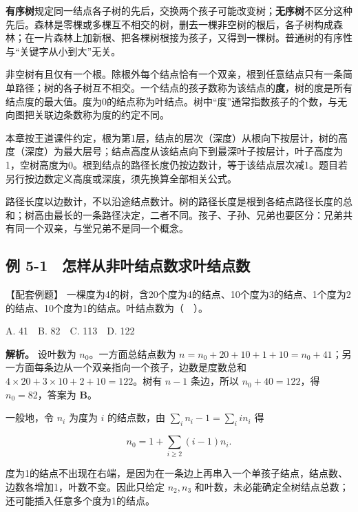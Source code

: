 \begin{definition}[树及结点的度]

\textbf{有序树}规定同一结点各子树的先后，交换两个孩子可能改变树；\textbf{无序树}不区分这种先后。森林是零棵或多棵互不相交的树，删去一棵非空树的根后，各子树构成森林；在一片森林上加新根、把各棵树根接为孩子，又得到一棵树。普通树的有序性与``关键字从小到大''无关。

非空树有且仅有一个根。除根外每个结点恰有一个双亲，根到任意结点只有一条简单路径；树的各子树互不相交。一个结点的孩子数称为该结点的\textbf{度}，树的度是所有结点度的最大值。度为0的结点称为叶结点。树中``度''通常指数孩子的个数，与无向图把关联边条数称为度的约定不同。

\end{definition}

本章按王道课件约定，根为第1层，结点的层次（深度）从根向下按层计，树的高度（深度）为最大层号；结点高度从该结点向下到最深叶子按层计，叶子高度为1，空树高度为0。根到结点的路径长度仍按边数计，等于该结点层次减1。题目若另行按边数定义高度或深度，须先换算全部相关公式。

路径长度以边数计，不以沿途结点数计。树的路径长度是根到各结点路径长度的总和；树高由最长的一条路径决定，二者不同。孩子、子孙、兄弟也要区分：兄弟共有同一个双亲，与堂兄弟不是同一个概念。

\subsection{例 5-1　怎样从非叶结点数求叶结点数}\label{DS05-ex1}

\begin{example}[配套案例]

【配套例题】 一棵度为4的树，含20个度为4的结点、10个度为3的结点、1个度为2的结点、10个度为1的结点。叶结点数为（　）。

A. 41　B. 82　C. 113　D. 122

\end{example}

\textbf{解析。} 设叶数为 \(n_0\)。一方面总结点数为 \(n=n_0+20+10+1+10=n_0+41\)；另一方面每条边从一个双亲指向一个孩子，边数是度数总和 \(4\times20+3\times10+2+10=122\)。树有 \(n-1\) 条边，所以 \(n_0+40=122\)，得 \(n_0=82\)，答案为 \textbf{B}。

一般地，令 \(n_i\) 为度为 \(i\) 的结点数，由 \(\sum_i n_i-1=\sum_i i n_i\) 得

\[n_0=1+\sum_{i\ge2}(i-1)n_i.\]

度为1的结点不出现在右端，是因为在一条边上再串入一个单孩子结点，结点数、边数各增加1，叶数不变。因此只给定 \(n_2,n_3\) 和叶数，未必能确定全树结点总数；还可能插入任意多个度为1的结点。

